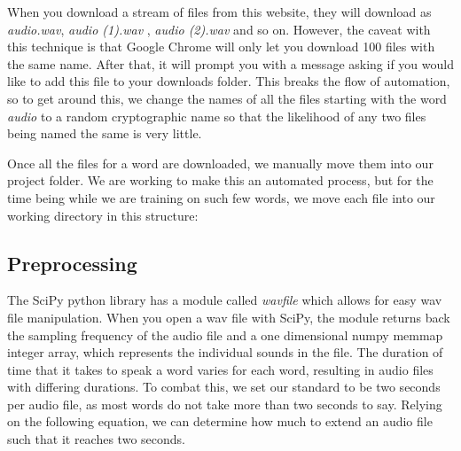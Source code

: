 \documentclass{article}
\begin{document}
When you download a stream of files from this website, they will download as \textit{audio.wav}, \textit{audio (1).wav} , \textit{audio (2).wav} and so on. However, the caveat with this technique is that Google Chrome will only let you download 100 files with the same name. After that, it will prompt you with a message asking if you would like to add this file to your downloads folder. This breaks the flow of automation, so to get around this, we change the names of all the files starting with the word \textit{audio} to a random cryptographic name so that the likelihood of any two files being named the same is very little. 

Once all the files for a word are downloaded, we manually move them into our project folder. We are working to make this an automated process, but for the time being while we are training on such few words, we move each file into our working directory in this structure:


\subsection{Preprocessing}

The SciPy python library has a module called \textit{wavfile} which allows for easy wav file manipulation. When you open a wav file with SciPy, the module returns back the sampling frequency of the audio file and a one dimensional numpy memmap integer array, which represents the individual sounds in the file. The duration of time that it takes to speak a word varies for each word, resulting in audio files with differing durations. To combat this, we set our standard to be two seconds per audio file, as most words do not take more than two seconds to say. Relying on the following equation, we can determine how much to extend an audio file such that it reaches two seconds. 
\end{document}
